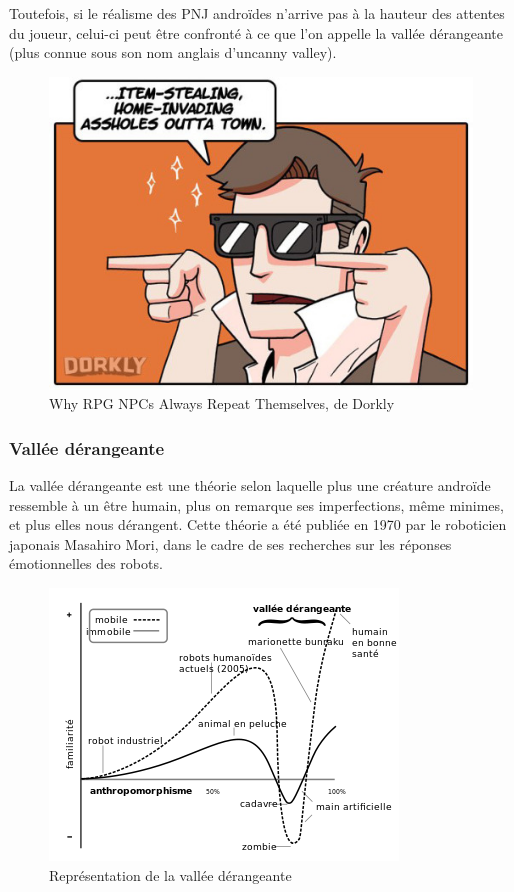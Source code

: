 \documentclass[a4paper, 12pt]{article} %
\begin{document}
Toutefois, si le réalisme des PNJ androïdes n’arrive pas à la hauteur des attentes du joueur, celui-ci peut être confronté à ce que l'on appelle la vallée dérangeante (plus connue sous son nom anglais d’uncanny valley).

\begin{figure}[!h]%
	\begin{center} 
		\includegraphics[width=0.60\columnwidth]{images/repeat4.png}%
		\caption{Why RPG NPCs Always Repeat Themselves, de Dorkly}%
	\end{center}
\end{figure}

\newpage
\subsubsection{Vallée dérangeante}

La vallée dérangeante est une théorie selon laquelle plus une créature androïde ressemble à un être humain, plus on remarque ses imperfections, même minimes, et plus elles nous dérangent. Cette théorie a été publiée en 1970 par le roboticien japonais Masahiro Mori, dans le cadre de ses recherches sur les réponses émotionnelles des robots.

\begin{figure}[!h]%
	\begin{center} 
		\includegraphics[width=0.60\columnwidth]{images/uncannyValley.png}%
		\caption{Représentation de la vallée dérangeante}%
	\end{center}
\end{figure}
\end{document}
